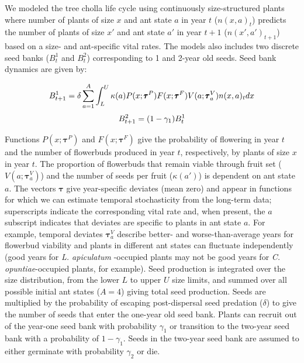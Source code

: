 \documentclass[11pt]{article}
\begin{document}
We modeled the tree cholla life cycle using continuously size-structured plants where number of plants of size $x$  and ant state $a$ in year $t$ ($n(x,a)_{t}$) predicts the number of plants of size $x'$ and ant state $a'$ in year $t+1$ ($n(x',a')_{t+1}$) based on a size- and ant-specific vital rates. 
The models also includes two discrete seed banks ($B^1_{t}$ and $B^2_{t}$) corresponding to 1 and 2-year old seeds. 
Seed bank dynamics are given by:

\begin{linenomath*}
	$$
	B^1_{t+1} = \delta \sum_{a=1}^{A} \int_L^U  \kappa(a) P(x;\pmb{\tau}^P) F(x;\pmb{\tau}^F) V(a;\pmb{\tau}^V_{a}) n(x,a)_{t} dx \\
	$$
	$$
	B^2_{t+1} =  (1 - \gamma_1)B^1_{t}\\
	$$
	\label{eqn:IPM1}
\end{linenomath*}

\noindent %
Functions $P(x;\pmb{\tau}^P)$ and $F(x;\pmb{\tau}^F)$ give the probability of flowering in year $t$ and the number of flowerbuds produced in year $t$, respectively, by plants of size $x$ in year $t$. 
The proportion of flowerbuds that remain viable through fruit set ($V(a;\pmb{\tau}^V_{a})$) and the number of seeds per fruit ($\kappa(a')$) is dependent on ant state $a$. 
The vectors $\pmb{\tau}$ give year-specific deviates (mean zero) and appear in functions for which we can estimate temporal stochasticity from the long-term data; superscripts indicate the corresponding vital rate and, when present, the $a$ subscript indicates that deviates are specific to plants in ant state $a$.
For example, temporal deviates $\pmb{\tau}^V_{a}$ describe better- and worse-than-average years for flowerbud viability and plants in different ant states can fluctuate independently (good years for \textit{L. apiculatum} -occupied plants may not be good years for \textit{C. opuntiae}-occupied plants, for example). 
Seed production is integrated over the size distribution, from the lower $L$ to upper $U$ size limits, and summed over all possible initial ant states ($A=4$) giving total seed production. 
Seeds are multiplied by the probability of escaping post-dispersal seed predation ($\delta$) to give the number of seeds that enter the one-year old seed bank. 
Plants can recruit out of the year-one seed bank with probability $\gamma_1$ or transition to the two-year seed bank with a probability of $1 - \gamma_1$. 
Seeds in the two-year seed bank are assumed to either germinate with probability $\gamma_2$ or die. 
\end{document}

